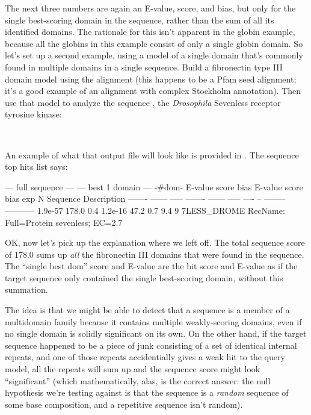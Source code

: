 The next three numbers are again an E-value, score, and bias, but only
for the single best-scoring domain in the sequence, rather than the
sum of all its identified domains. The rationale for this isn't
apparent in the globin example, because all the globins in this
example consist of only a single globin domain. So let's set up a
second example, using a model of a single domain that's commonly found
in multiple domains in a single sequence. Build a fibronectin type III
domain model using the  alignment (this happens
to be a Pfam seed alignment; it's a good example of an alignment with
complex Stockholm annotation). Then use that model to analyze the
sequence , the \emph{Drosophila} Sevenless
receptor tyrosine kinase:

 \\

An example of what that output file will look like is provided in
. The sequence top hits list says:

\begin{sreoutput}
   --- full sequence ---   --- best 1 domain ---    -#dom-
    E-value  score  bias    E-value  score  bias    exp  N  Sequence    Description
    ------- ------ -----    ------- ------ -----   ---- --  --------    -----------
    1.9e-57  178.0   0.4    1.2e-16   47.2   0.7    9.4  9  7LESS_DROME RecName: Full=Protein sevenless;          EC=2.7
\end{sreoutput}

OK, now let's pick up the explanation where we left off. The total
sequence score of 178.0 sums up \emph{all} the fibronectin III domains
that were found in the  sequence. The ``single best
dom'' score and E-value are the bit score and E-value as if the target
sequence only contained the single best-scoring domain, without this
summation.

The idea is that we might be able to detect that a sequence is a
member of a multidomain family because it contains multiple
weakly-scoring domains, even if no single domain is solidly
significant on its own.  On the other hand, if the target sequence
happened to be a piece of junk consisting of a set of identical
internal repeats, and one of those repeats accidentially gives a weak
hit to the query model, all the repeats will sum up and the sequence
score might look ``significant'' (which mathematically, alas, is the
correct answer: the null hypothesis we're testing against is that the
sequence is a \emph{random} sequence of some base composition, and a
repetitive sequence isn't random).


